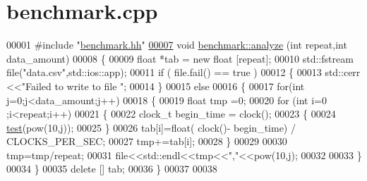 \hypertarget{benchmark_8cpp_source}{}\section{benchmark.\+cpp}
\label{benchmark_8cpp_source}

\begin{DoxyCode}
00001 \textcolor{preprocessor}{#include "\hyperlink{benchmark_8hh}{benchmark.hh}"} 
\hypertarget{benchmark_8cpp_source_l00007}{}\hyperlink{classbenchmark_a23e508cd746c10ba8a650965673aa839}{00007} \textcolor{keywordtype}{void} \hyperlink{classbenchmark_a23e508cd746c10ba8a650965673aa839}{benchmark::analyze} (\textcolor{keywordtype}{int} repeat,\textcolor{keywordtype}{int} data\_amount)
00008 \{
00009   \textcolor{keywordtype}{float} *tab = \textcolor{keyword}{new} \textcolor{keywordtype}{float} [repeat];
00010   std::fstream file(\textcolor{stringliteral}{"data.csv"},std::ios::app);
00011   \textcolor{keywordflow}{if} ( file.fail() == true )
00012     \{
00013       std::cerr <<\textcolor{stringliteral}{"Failed to write to file "};
00014     \}
00015   \textcolor{keywordflow}{else}
00016     \{
00017       \textcolor{keywordflow}{for}(\textcolor{keywordtype}{int} j=0;j<data\_amount;j++)
00018     \{
00019       \textcolor{keywordtype}{float} tmp =0;
00020       \textcolor{keywordflow}{for} (\textcolor{keywordtype}{int} i=0 ;i<repeat;i++)
00021         \{
00022           clock\_t begin\_time = clock();
00023           \{
00024         \hyperlink{classbenchmark_a698d333f815e6e12c0817b1dfee56e99}{test}(pow(10,j));
00025           \}
00026           tab[i]=float( clock()- begin\_time) / CLOCKS\_PER\_SEC;
00027           tmp+=tab[i];
00028         \}
00029       
00030       tmp=tmp/repeat;
00031       file<<std::endl<<tmp<<\textcolor{stringliteral}{","}<<pow(10,j);
00032         
00033     \}
00034     \}
00035   \textcolor{keyword}{delete} [] tab;
00036 \}
00037 
00038 
\end{DoxyCode}
